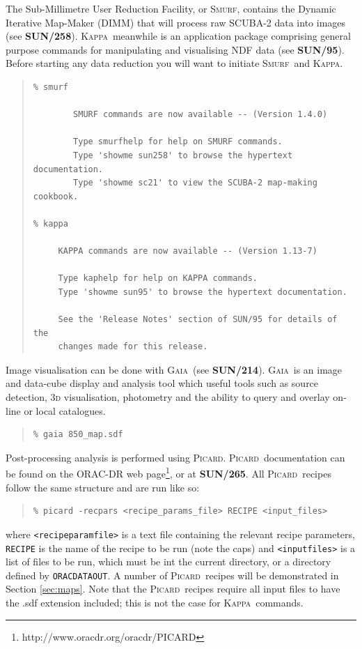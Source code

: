\documentclass[twoside,11pt]{article}
\newcommand{\htmladdnormallinkfoot}[2]{#1\footnote{#2}}
\newcommand{\xref}[3]{#1}
\renewcommand{\_}{\texttt{\symbol{95}}}
\newenvironment{myquote}{\begin{quote}\begin{small}}{\end{small}\end{quote}}
\newcommand{\gaia}{\xref{\textsc{Gaia}}{sun214}{}}
\newcommand{\Kappa}{\xref{\textsc{Kappa}}{sun95}{}}
\newcommand{\picard}{\xref{\textsc{Picard}}{sun265}{}}
\newcommand{\smurf}{\xref{\textsc{Smurf}}{sun258}{}}
\newcommand{\param}[1]{\texttt{#1}}
\newcommand{\gaiasun}{\xref{\textbf{SUN/214}}{sun214}{}}
\newcommand{\kappasun}{\xref{\textbf{SUN/95}}{sun95}{}}
\newcommand{\picardsun}{\xref{\textbf{SUN/265}}{sun265}{}}
\newcommand{\smurfsun}{\xref{\textbf{SUN/258}}{sun258}{}}
\begin{document}
The Sub-Millimetre User Reduction Facility, or \smurf, contains the Dynamic Iterative Map-Maker (DIMM) that will process raw SCUBA-2 data into images (see \smurfsun). \Kappa\ meanwhile is an application package comprising general purpose commands for manipulating and visualising NDF data (see \kappasun). Before starting any data reduction you will want to initiate \smurf\ and \Kappa.
\begin{myquote}
\begin{verbatim}
% smurf

        SMURF commands are now available -- (Version 1.4.0)

        Type smurfhelp for help on SMURF commands.
        Type 'showme sun258' to browse the hypertext documentation.
        Type 'showme sc21' to view the SCUBA-2 map-making cookbook.

% kappa

     KAPPA commands are now available -- (Version 1.13-7)

     Type kaphelp for help on KAPPA commands.
     Type 'showme sun95' to browse the hypertext documentation.

     See the 'Release Notes' section of SUN/95 for details of the
     changes made for this release.
\end{verbatim}
\end{myquote}
Image visualisation can be done with \gaia\ (see \gaiasun). \gaia\ is an image and data-cube display and analysis tool which useful tools such as source detection, 3\textsc{d} visualisation, photometry and the ability to query and overlay on-line  or local catalogues. 
\begin{myquote}
\begin{verbatim}
% gaia 850_map.sdf
\end{verbatim}
\end{myquote}

Post-processing analysis is performed using \picard. \picard\ documentation can be found on \htmladdnormallinkfoot{the ORAC-DR web page}{http://www.oracdr.org/oracdr/PICARD}, or at \picardsun. All \picard\ recipes follow the same structure and are run like so:
\begin{myquote}
\begin{verbatim}
% picard -recpars <recipe_params_file> RECIPE <input_files>
\end{verbatim}
\end{myquote}
where \param{<recipe\_param\_file>} is a text file containing the relevant recipe parameters, \param{RECIPE} is the name of the recipe to be run (note the caps) and \param{<input\_files>} is a list of files to be run, which must be int the current directory, or a directory defined by \param{ORAC\_DATA\_OUT}. A number of \picard\ recipes will be demonstrated in Section \ref{sec:maps}. Note that the \picard\ recipes require all input files to have the .sdf extension included; this is not the case for \Kappa\ commands. 
\end{document}
